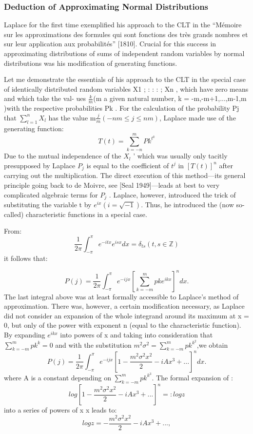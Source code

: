 \documentclass{article}
\begin{document}
\subsubsection{Deduction  of Approximating Normal Distributions}
Laplace for the first time exemplified his approach to the CLT in the “Mémoire
sur les approximations des formules qui sont fonctions des très grands nombres
et sur leur application aux probabilités” [1810]. Crucial for this success in
approximating distributions of sums of independent random variables by normal
distributions was his modification of generating functions.

Let me demonstrate the essentials of his approach to the CLT  in the special case of identically distributed
random variables X1 ; : : : ; Xn , which have zero means and which take the val-
ues $ \frac{k}{m}$(m a given natural number, k = -m,-m+1,...,m-1,m )with the
respective probabilities Pk .
For the calculation of the probability Pj that $ \sum_{l=1}^{n} X_{l} $ 
has the value m$\frac{j}{m}(-nm \leq j \leq nm)$, Laplace made use of the generating function:
\[ T(t) = \sum_{k=-n}^{m} Pk^{t^{k}} \]
Due to the mutual independence of the $X_l$ ’ which was usually only tacitly presupposed by Laplace $P_j$ is equal to the coefficient
of $ t^{j}  $ in $ [T(t)]^n  $  after carrying out the multiplication.
The direct execution of this method—its general principle going back to de Moivre, see [Seal 1949]—leads at
best to very complicated algebraic terms for $P_j$ .
Laplace, however, introduced the trick of substituting the variable t by $ e^{ix} (i= \sqrt{-1})$. Thus, he introduced the (now so-called) characteristic functions in a special case.

From:
  \[ \frac{1}{2\pi} \int_{-\pi}^{ \pi} e^{-itx} e^{isx} dx = \delta_{ts} (t,s \in \mathbb{Z} ) \]   
it follows that:
  
  \[ P(j) = \frac{1}{2\pi} \int _{-\pi}^{\pi} e^{-ijx}[\sum_{k=-m}^{m} pke^{ikx}]^n dx. \] 
  The last integral above was at least formally accessible to Laplace’s method of approximation. There was, however, a certain modification necessary, as Laplace did not consider an expansion of the whole integrand around its maximum at
x = 0, but only of the power with exponent n (equal to the characteristic function).
By expanding $e^{ikx}$ into powers of x and taking into consideration that
$  \sum_{k=-m}^{m} pk^{k}= 0 $ and with the substitution $ m^2\sigma^2 = \sum_{k=-m}^{m} pk^{k^2}$,we obtain 
\[ P(j) = \frac{1}{2\pi} \int _{-\pi}^{\pi} e^{-ijx}[1-\frac{m^2\sigma^2x^2}{2} -iAx^3 + ... ]^n dx. \] where A is a constant depending on $ \sum_{k=-m}^{m} pk^{k^3}$.
The formal expansion of :
\[ log[1-\frac{m^2\sigma^2x^2}{2} -iAx^3 + ... ]^n = : log z \]
into a series of powers of x x leads to:
\[ log z= -\frac{m^2\sigma^2x^2}{2} -iAx^3 + ... , \]
\end{document}
